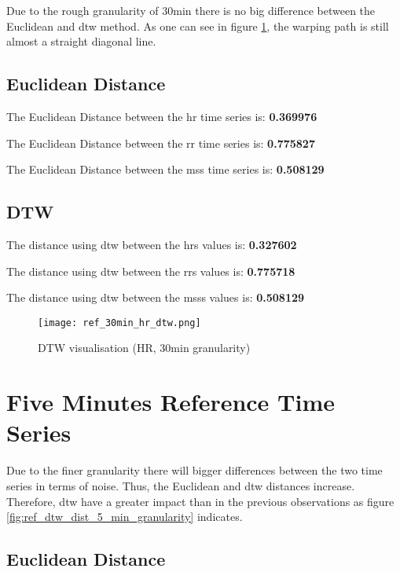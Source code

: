 Due to the rough granularity of 30min there is no big difference between the Euclidean and \ac{dtw} method. As one can see in figure \ref{fig:ref_dtw_dist_30_min_granularity}, the warping path is still almost a straight diagonal line.

\subsection{Euclidean Distance}

The Euclidean Distance between the \ac{hr} time series is: \textbf{0.369976}


The Euclidean Distance between the \ac{rr} time series is: \textbf{0.775827}



The Euclidean Distance between the \ac{mss} time series is: \textbf{0.508129}



\subsection{DTW}

The distance using \ac{dtw} between the \acp{hr} values is: \textbf{0.327602}


The distance using \ac{dtw} between the \acp{rr} values is: \textbf{0.775718}


The distance using \ac{dtw} between the \acp{mss} values is: \textbf{0.508129}



\begin{figure}[h!]
	\texttt{[image: ref\_30min\_hr\_dtw.png]}
	\caption{DTW visualisation (HR, 30min granularity)}
	\label{fig:ref_dtw_dist_30_min_granularity}
\end{figure}


\clearpage
\section{Five Minutes Reference Time Series}

Due to the finer granularity there will bigger differences between the two time series in terms of noise. Thus, the Euclidean and \ac{dtw} distances increase. Therefore, \ac{dtw} have a greater impact than in the previous observations as figure \ref{fig:ref_dtw_dist_5_min_granularity} indicates.

\subsection{Euclidean Distance}


